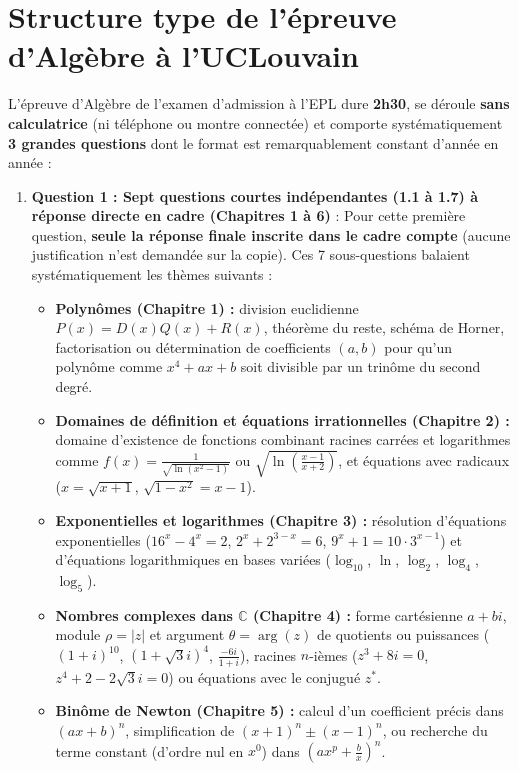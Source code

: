 \documentclass[11pt,a4paper,oneside]{book}
\newcommand{\C}{\mathbb{C}}
\begin{document}
\section*{Structure type de l'épreuve d'Algèbre à l'UCLouvain}

L'épreuve d'Algèbre de l'examen d'admission à l'EPL dure \textbf{2h30}, se déroule \textbf{sans calculatrice} (ni téléphone ou montre connectée) et comporte systématiquement \textbf{3 grandes questions} dont le format est remarquablement constant d'année en année :
\begin{enumerate}
    \item \textbf{Question 1 : Sept questions courtes indépendantes (1.1 à 1.7) à réponse directe en cadre (Chapitres 1 à 6)} :
    Pour cette première question, \textbf{seule la réponse finale inscrite dans le cadre compte} (aucune justification n'est demandée sur la copie). Ces 7 sous-questions balaient systématiquement les thèmes suivants :
    \begin{itemize}
        \item \textbf{Polynômes (Chapitre 1) :} division euclidienne $P(x) = D(x)Q(x) + R(x)$, théorème du reste, schéma de Horner, factorisation ou détermination de coefficients $(a,b)$ pour qu'un polynôme comme $x^4+ax+b$ soit divisible par un trinôme du second degré.
        \item \textbf{Domaines de définition et équations irrationnelles (Chapitre 2) :} domaine d'existence de fonctions combinant racines carrées et logarithmes comme $f(x) = \frac{1}{\sqrt{\ln(x^2-1)}}$ ou $\sqrt{\ln\left(\frac{x-1}{x+2}\right)}$, et équations avec radicaux ($x = \sqrt{x+1}$, $\sqrt{1-x^2} = x-1$).
        \item \textbf{Exponentielles et logarithmes (Chapitre 3) :} résolution d'équations exponentielles ($16^x - 4^x = 2$, $2^x + 2^{3-x} = 6$, $9^x + 1 = 10\cdot 3^{x-1}$) et d'équations logarithmiques en bases variées ($\log_{10}$, $\ln$, $\log_2$, $\log_4$, $\log_5$).
        \item \textbf{Nombres complexes dans $\C$ (Chapitre 4) :} forme cartésienne $a+bi$, module $\rho = |z|$ et argument $\theta = \arg(z)$ de quotients ou puissances ($(1+i)^{10}$, $(1+\sqrt{3}i)^4$, $\frac{-6i}{1+i}$), racines $n$-ièmes ($z^3+8i=0$, $z^4+2-2\sqrt{3}i=0$) ou équations avec le conjugué $z^*$.
        \item \textbf{Binôme de Newton (Chapitre 5) :} calcul d'un coefficient précis dans $(ax+b)^n$, simplification de $(x+1)^n \pm (x-1)^n$, ou recherche du terme constant (d'ordre nul en $x^0$) dans $\left(ax^p + \frac{b}{x}\right)^n$.

\end{itemize}
\end{enumerate}
\end{document}
